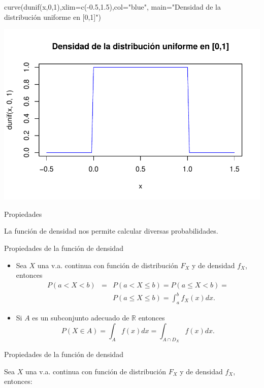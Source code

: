 \documentclass[
  letterpaper,
  DIV=11,
  numbers=noendperiod]{scrreprt}
\newenvironment{Shaded}{\begin{snugshade}}{\end{snugshade}}
\newcommand{\AttributeTok}[1]{\textcolor[rgb]{0.40,0.45,0.13}{#1}}
\newcommand{\DecValTok}[1]{\textcolor[rgb]{0.68,0.00,0.00}{#1}}
\newcommand{\FloatTok}[1]{\textcolor[rgb]{0.68,0.00,0.00}{#1}}
\newcommand{\FunctionTok}[1]{\textcolor[rgb]{0.28,0.35,0.67}{#1}}
\newcommand{\NormalTok}[1]{\textcolor[rgb]{0.00,0.23,0.31}{#1}}
\newcommand{\SpecialCharTok}[1]{\textcolor[rgb]{0.37,0.37,0.37}{#1}}
\newcommand{\StringTok}[1]{\textcolor[rgb]{0.13,0.47,0.30}{#1}}
\begin{document}
\begin{Shaded}
\begin{Highlighting}[]
\FunctionTok{curve}\NormalTok{(}\FunctionTok{dunif}\NormalTok{(x,}\DecValTok{0}\NormalTok{,}\DecValTok{1}\NormalTok{),}\AttributeTok{xlim=}\FunctionTok{c}\NormalTok{(}\SpecialCharTok{{-}}\FloatTok{0.5}\NormalTok{,}\FloatTok{1.5}\NormalTok{),}\AttributeTok{col=}\StringTok{"blue"}\NormalTok{,}
      \AttributeTok{main=}\StringTok{"Densidad de la distribución uniforme en [0,1]"}\NormalTok{)}
\end{Highlighting}
\end{Shaded}

\begin{center}
\includegraphics[width=0.5\linewidth,height=\textheight,keepaspectratio]{variables_aleatorias_files/figure-pdf/unnamed-chunk-1-1.pdf}
\end{center}

Propiedades

La función de densidad nos permite calcular diversas probabilidades.

Propiedades de la función de densidad

\begin{itemize}
\item
  Sea \(X\) una v.a. continua con función de distribución \(F_X\) y de
  densidad \(f_X\), entonces \begin{eqnarray*}
  P(a< X< b) &=&  P(a<X\leq b)= P(a\leq X< b)=\\
   & & P(a\leq X\leq b)= \displaystyle\int_{a}^b f_X(x) dx.
  \end{eqnarray*}
\item
  Si \(A\) es un subconjunto adecuado de \(\mathbb{R}\) entonces
  \[P(X\in A)=\displaystyle\int_{A} f(x) dx=\displaystyle\int_{A\cap D_X} f(x) dx.
  \]
\end{itemize}

Propiedades de la función de densidad

Sea \(X\) una v.a. continua con función de distribución \(F_X\) y de
densidad \(f_X\), entonces:
\end{document}
